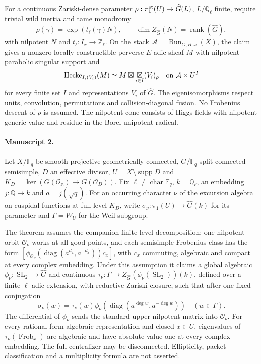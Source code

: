 \documentclass[11pt]{article}
\begin{document}
For a continuous Zariski-dense parameter $\rho:\pi_1^{\rm et}(U)\to\widehat G(L)$, $L/\mathbb Q_{\ell}$ finite, require trivial wild inertia and tame monodromy
\[
 \rho(\gamma)=\exp(t_{\ell}(\gamma)N),\qquad
 \dim Z_{\widehat G}(N)=\operatorname{rank}(\widehat G),
\]
with nilpotent $N$ and $t_{\ell}:I_x\to\mathbb Z_{\ell}$. On the stack $\mathcal A=\operatorname{Bun}_{G,B,x}(X)$, the claim gives a nonzero locally constructible perverse $E$-adic sheaf $M$ with nilpotent parabolic singular support and
\[
 \operatorname{Hecke}_{I,(V_i)}(M)\simeq
 M\boxtimes\mathop{\boxtimes}_{i\in I}(V_i)_{\rho}
 \quad\hbox{on }\mathcal A\times U^I
\]
for every finite set $I$ and representations $V_i$ of $\widehat G$. The eigenisomorphisms respect units, convolution, permutations and collision-diagonal fusion. No Frobenius descent of $\rho$ is assumed. The nilpotent cone consists of Higgs fields with nilpotent generic value and residue in the Borel unipotent radical.

\paragraph{Manuscript 2.}
Let $X/\mathbb F_q$ be smooth projective geometrically connected, $G/\mathbb F_q$ split connected semisimple, $D$ an effective divisor, $U=X\setminus\operatorname{supp}D$ and $K_D=\ker(G(\mathcal O_{\mathbb A})\to G(\mathcal O_D))$. Fix $\ell\ne\operatorname{char}\mathbb F_q$, $k=\overline{\mathbb Q}_{\ell}$, an embedding $j:\overline{\mathbb Q}\to k$ and $a=j(\sqrt q)$. For an occurring character $\nu$ of the excursion algebra on cuspidal functions at full level $K_D$, write $\sigma_{\nu}:\pi_1(U)\to\widehat G(k)$ for its parameter and $\Gamma=W_U$ for the Weil subgroup.

The theorem assumes the companion finite-level decomposition: one nilpotent orbit $\mathcal O_{\nu}$ works at all good points, and each semisimple Frobenius class has the form $[\phi_{\mathcal O_{\nu}}(\operatorname{diag}(a^{d_x},a^{-d_x}))c_x]$, with $c_x$ commuting, algebraic and compact at every complex embedding. Under this assumption it claims a global algebraic $\phi_{\nu}:\operatorname{SL}_2\to\widehat G$ and continuous $\tau_{\nu}:\Gamma\to Z_{\widehat G}(\phi_{\nu}(\operatorname{SL}_2))(k)$, defined over a finite $\ell$-adic extension, with reductive Zariski closure, such that after one fixed conjugation
\[
 \sigma_{\nu}(w)=\tau_{\nu}(w)\phi_{\nu}(\operatorname{diag}(a^{\deg w},a^{-\deg w}))\quad(w\in\Gamma).
\]
The differential of $\phi_{\nu}$ sends the standard upper nilpotent matrix into $\mathcal O_{\nu}$. For every rational-form algebraic representation and closed $x\in U$, eigenvalues of $\tau_{\nu}(\operatorname{Frob}_x)$ are algebraic and have absolute value one at every complex embedding. The full centralizer may be disconnected. Ellipticity, packet classification and a multiplicity formula are not asserted.
\end{document}
